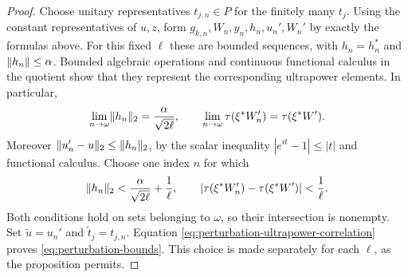 \begin{proof}
Choose unitary representatives $t_{j,n}\in P$ for the finitely
many $t_j$.  Using the constant representatives of $u,z$, form
$g_{k,n},W_n,y_n,h_n,u_n',W_n'$ by exactly the formulas above.
For this fixed $\ell$ these are bounded sequences, with
$h_n=h_n^*$ and $\lVert h_n\rVert\le\alpha$.
Bounded algebraic operations and continuous functional calculus
in the quotient show that they represent the corresponding
ultrapower elements.  In particular,
\[
  \lim_{n\to\omega}\lVert h_n\rVert_2
       =\frac\alpha{\sqrt{2\ell}},\qquad
  \lim_{n\to\omega}\tau(\xi^*W_n')=\tau(\xi^*W').
\]
Moreover $\lVert u_n'-u\rVert_2\le\lVert h_n\rVert_2$, by the scalar
inequality $|e^{it}-1|\le|t|$ and functional calculus.
Choose one index $n$ for which
\[
  \lVert h_n\rVert_2<\frac\alpha{\sqrt{2\ell}}+\frac1\ell,
  \qquad
  |\tau(\xi^*W_n')-\tau(\xi^*W')|<\frac1\ell.
\]
Both conditions hold on sets belonging to $\omega$, so their
intersection is nonempty.  Set $\widetilde u=u_n'$ and
$\widetilde t_j=t_{j,n}$.  Equation
\eqref{eq:perturbation-ultrapower-correlation} proves
\eqref{eq:perturbation-bounds}.  This choice is made separately
for each $\ell$, as the proposition permits.
\end{proof}
